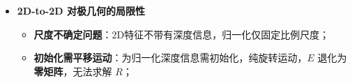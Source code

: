 \documentclass[../main.tex]{subfiles}
\begin{document}
\begin{enumerate}
\begin{itemize}
\begin{enumerate}
\begin{itemize}
\begin{itemize}
\begin{small}
\begin{itemize}
\begin{enumerate}
            \paragraph{例题：}Q：RANSAC拟合算法，内点70\%，希望得到好样本的概率是99.9\%，K最小值为？\\
            A：已知内点比例 \(w=0.7\)，需要的最小样本数 \(s=8\)，希望至少一次抽到“全内点样本”的概率为 \(p=0.999\)。一次抽样全为内点的概率为 \(w^s\)，则一次抽到的s个样本全都是内点的概率为：
            $$\omega^s$$
            则一次抽到的s个样本存在非内点，即不全都是内点的概率为：
            $$1-\omega^s$$
            则K次抽取样本，这K次中没有一次是抽到的都是内点的，即每次都是“不全都是内点”的概率为：
            $$(1-\omega^s)^K$$
            则K次抽取样本，至少存在一次抽到了s个样本都是内点的概率为：
            $$1-(1-\omega^s)^K$$
            则有：
            \[
            1-(1-w^s)^K \ge p\ \Rightarrow\
            K \ge \frac{\log(1-p)}{\log(1-w^s)}.
            \]
            代入 \(w=0.7,\,s=8,\,p=0.999\) 得
            \[
            K \ge \frac{\log(0.001)}{\log(1-0.7^8)} \approx 116.34,
            \]
            故取最小整数 \(K=117\) 次。
        \\==============================
        \end{enumerate}
        \end{itemize}
        \end{small}
        \item \textbf{2D-to-2D 对极几何的局限性}
        \begin{itemize}
            \item \textbf{尺度不确定问题}：2D特征不带有深度信息，归一化仅固定比例尺度；
            \item \textbf{初始化需平移运动}：为归一化深度信息需初始化，纯旋转运动，$E$ 退化为\textbf{零矩阵}，无法求解 $R$；
        \end{itemize}


\end{itemize}
\end{itemize}
\end{enumerate}
\end{itemize}
\end{enumerate}
\end{document}
